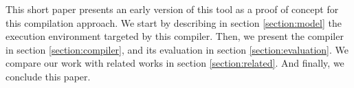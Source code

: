 This short paper presents an early version of this tool as a proof of concept for this compilation approach.
We start by describing in section \ref{section:model} the execution environment targeted by this compiler.
Then, we present the compiler in section \ref{section:compiler}, and its evaluation in section \ref{section:evaluation}.
We compare our work with related works in section \ref{section:related}.
And finally, we conclude this paper.